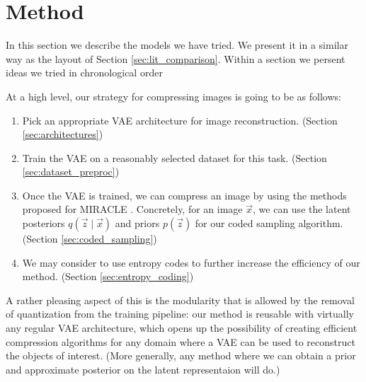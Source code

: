 
\chapter{Method}
\label{chapter:method}

\graphicspath{{../img/thesis/}{../img/plots/vae_latents/}}

\par
In this section we describe the models we have tried. We present it in a similar
way as the layout of Section \ref{sec:lit_comparison}. Within a section we
persent ideas we tried in chronological order

At a high level, our strategy for compressing images is going to be as follows:

\begin{enumerate}
\item Pick an appropriate VAE architecture for image reconstruction. (Section
  \ref{sec:architectures})
\item Train the VAE on a reasonably selected dataset for this task. (Section
  \ref{sec:dataset_preproc})
\item Once the VAE is trained, we can compress an image by using the methods
  proposed for MIRACLE \cite{havasi2018minimal}. Concretely, for an image
  $\vec{x}$, we can use the latent posteriors $q(\vec{z} \mid \vec{x})$ and
  priors $p(\vec{z})$ for our coded sampling algorithm. (Section
  \ref{sec:coded_sampling})
\item We may consider to use entropy codes to further increase the efficiency of
  our method. (Section \ref{sec:entropy_coding})
\end{enumerate}

\par
A rather pleasing aspect of this is the modularity that is allowed by the
removal of quantization from the training pipeline: our method is reusable with
virtually any regular VAE architecture, which opens up the possibility of
creating efficient compression algorithms for any domain where a VAE can be used
to reconstruct the objects of interest. (More generally, any method where we
can obtain a prior and approximate posterior on the latent representaion will do.)

